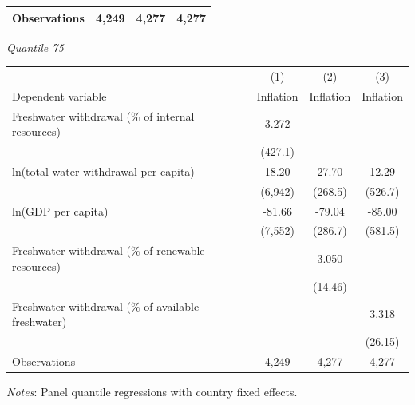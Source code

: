 \begin{table}[htbp]
\begin{tabular}{lccc}
\hline
Observations & 4,249 & 4,277 & 4,277 \\
\hline
\end{tabular}
\vspace{0.75em}
\textit{Quantile 75}\\
\begin{tabular}{lccc}
\hline
 & (1) & (2) & (3) \\
Dependent variable & Inflation & Inflation & Inflation \\
\hline
Freshwater withdrawal (\% of internal resources) & 3.272 &  &  \\
 & (427.1) &  &  \\
ln(total water withdrawal per capita) & 18.20 & 27.70 & 12.29 \\
 & (6,942) & (268.5) & (526.7) \\
ln(GDP per capita) & -81.66 & -79.04 & -85.00 \\
 & (7,552) & (286.7) & (581.5) \\
Freshwater withdrawal (\% of renewable resources) &  & 3.050 &  \\
 &  & (14.46) &  \\
Freshwater withdrawal (\% of available freshwater) &  &  & 3.318 \\
 &  &  & (26.15) \\
\hline
Observations & 4,249 & 4,277 & 4,277 \\
\hline
\end{tabular}
\vspace{0.5em}
\parbox{0.95\textwidth}{\footnotesize \textit{Notes}: Panel quantile regressions with country fixed effects.}
\end{table}
